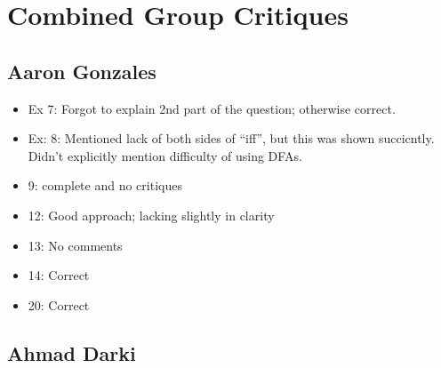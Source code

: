 \documentclass[titlepage]{article}\usepackage[]{graphicx}\usepackage[]{color}
\begin{document}
\section*{Combined Group Critiques}
\subsection{Aaron Gonzales}
\begin{itemize}
	\item Ex 7: Forgot to explain 2nd part of the question; otherwise correct.
	\item Ex: 8: Mentioned lack of both sides of ``iff'', but this was shown
		succicntly. Didn't explicitly mention difficulty of using DFAs.
	\item 9: complete and no critiques
	\item 12: Good approach; lacking slightly in clarity
	\item 13: No comments
	\item 14: Correct
	\item 20: Correct
\end{itemize}
\subsection{Ahmad Darki}

\begin{itemize}
\end{itemize}
\end{document}
